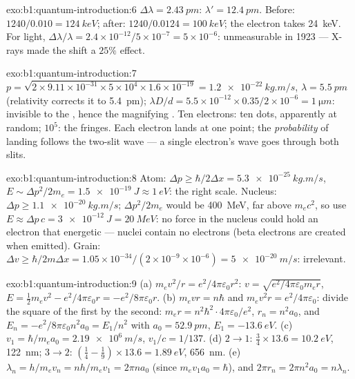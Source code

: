 \begin{solution}{exo:b1:quantum-introduction:6}
$\Delta\lambda = \qty{2.43}{pm}$: $\lambda' = \qty{12.4}{pm}$. Before: $1240/0.010 =
\qty{124}{keV}$; after: $1240/0.0124 = \qty{100}{keV}$; the electron takes
\qty{24}{keV}. For light, $\Delta\lambda/\lambda = 2.4 \times 10^{-12}/5 \times 10^{-7} = 5 \times
10^{-6}$: unmeasurable in 1923 --- X-rays made the shift a $25\%$ effect.
\end{solution}

\begin{solution}{exo:b1:quantum-introduction:7}
$p = \sqrt{2 \times 9.11 \times 10^{-31} \times 5 \times 10^4 \times 1.6 \times 10^{-19}} =
\qty{1.2e-22}{kg.m/s}$, $\lambda = \qty{5.5}{pm}$ (relativity corrects it to
\qty{5.4}{pm});  $\lambda D/d = 5.5 \times 10^{-12} \times 0.35/2 \times 10^{-6}
= \qty{1}{\micro m}$: invisible to the , hence the magnifying . Ten
electrons: ten dots, apparently at random; $10^5$: the fringes. Each
electron lands at one point; the \emph{probability} of landing follows
the two-slit wave --- a single electron's wave goes through both slits.
\end{solution}

\begin{solution}{exo:b1:quantum-introduction:8}
Atom: $\Delta p \geq \hbar/2\Delta x = \qty{5.3e-25}{kg.m/s}$, $E \sim \Delta p^2/2m_e =
\qty{1.5e-19}{J} \approx \qty{1}{eV}$: the right scale. Nucleus: $\Delta p \geq
\qty{1.1e-20}{kg.m/s}$; $\Delta p^2/2m_e$ would be \qty{400}{MeV}, far above
$m_ec^2$, so use $E \approx \Delta p\,c = \qty{3e-12}{J} = \qty{20}{MeV}$: no force
in the nucleus could hold an electron that energetic --- nuclei contain
no electrons (beta electrons are created when emitted). Grain: $\Delta v \geq
\hbar/2m\Delta x = 1.05 \times 10^{-34}/(2 \times 10^{-9} \times 10^{-6}) = \qty{5e-20}{m/s}$:
irrelevant.
\end{solution}

\begin{solution}{exo:b1:quantum-introduction:9}
(a) $m_ev^2/r = e^2/4\pi\varepsilon_0r^2$: $v = \sqrt{e^2/4\pi\varepsilon_0m_er}$, $E =
\tfrac12m_ev^2 - e^2/4\pi\varepsilon_0r = -e^2/8\pi\varepsilon_0r$. (b) $m_evr = n\hbar$ and
$m_ev^2r = e^2/4\pi\varepsilon_0$: divide the square of the first by the second:
$m_er = n^2\hbar^2 \cdot 4\pi\varepsilon_0/e^2$, $r_n = n^2a_0$, and $E_n = -e^2/8\pi\varepsilon_0n^2a_0
= E_1/n^2$ with $a_0 = \qty{52.9}{pm}$, $E_1 = \qty{-13.6}{eV}$. (c) $v_1 =
\hbar/m_ea_0 = \qty{2.19e6}{m/s}$, $v_1/c = 1/137$. (d) $2 \to 1$: $\tfrac34 \times
13.6 = \qty{10.2}{eV}$, \qty{122}{nm}; $3 \to 2$: $(\tfrac14 - \tfrac19) \times 13.6 =
\qty{1.89}{eV}$, \qty{656}{nm}. (e) $\lambda_n = h/m_ev_n = nh/m_ev_1 = 2\pi na_0$
(since $m_ev_1a_0 = \hbar$), and $2\pi r_n = 2\pi n^2a_0 = n\lambda_n$.
\end{solution}

